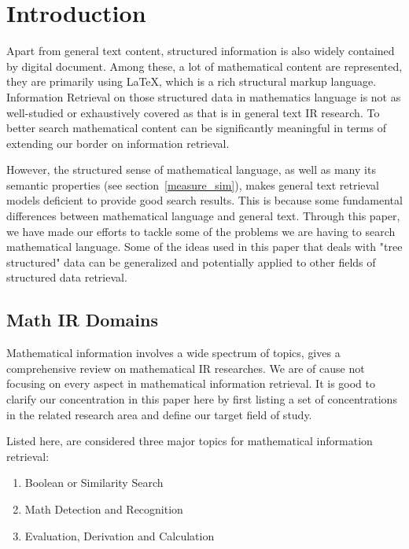 \chapter{Introduction}
Apart from general text content, structured information is also widely contained by digital document. 
Among these, a lot of mathematical content are represented, they are primarily using \LaTeX, which is a rich structural markup language. 
Information Retrieval on those structured data in mathematics language is not as well-studied or exhaustively covered as that is in general text IR research. 
To better search mathematical content can be significantly meaningful in terms of extending our border on information retrieval.


However, the structured sense of mathematical language, as well as many its semantic properties (see section~\ref{measure_sim}), makes general text retrieval models deficient to provide good search results. 
This is because some fundamental differences between mathematical language and general text.
Through this paper, we have made our efforts to tackle some of the problems we are having to search mathematical language. 
Some of the ideas used in this paper that deals with "tree structured" data can be generalized and potentially applied to other fields of structured data retrieval. 

\section{Math IR Domains}

Mathematical information involves a wide spectrum of topics, 
\cite{goodsurvey} gives a comprehensive review on mathematical IR researches.
We are of cause not focusing on every aspect in mathematical information retrieval. 
It is good to clarify our concentration in this paper here by first listing a set of concentrations in the related research area and define our target field of study.

\pagebreak
Listed here, are considered three major topics for mathematical information retrieval:

\begin{enumerate}
\item Boolean or Similarity Search
\item Math Detection and Recognition
\item Evaluation, Derivation and Calculation
\end{enumerate}

